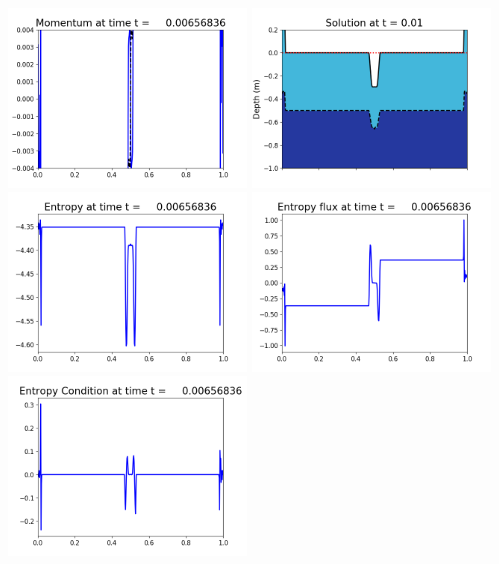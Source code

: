 \documentclass[11pt]{article}
\begin{document}
\vskip 10pt 
\includegraphics[width=0.475\textwidth]{frame0016fig1003.png}
\includegraphics[width=0.475\textwidth]{frame0016fig1006.png}
\vskip 10pt 
\includegraphics[width=0.475\textwidth]{frame0016fig1007.png}
\includegraphics[width=0.475\textwidth]{frame0016fig1008.png}
\vskip 10pt 
\includegraphics[width=0.475\textwidth]{frame0016fig1009.png}
\end{document}
